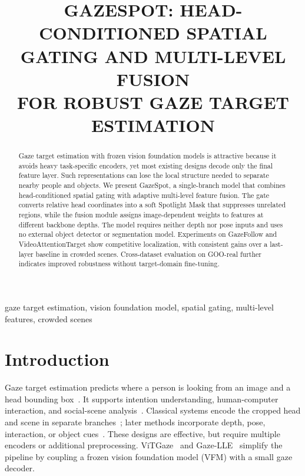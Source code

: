 \documentclass{article}
\title{GAZESPOT: HEAD-CONDITIONED SPATIAL GATING AND MULTI-LEVEL FUSION\\
FOR ROBUST GAZE TARGET ESTIMATION}
\begin{document}
\ninept
\maketitle

\begin{abstract}
Gaze target estimation with frozen vision foundation models is attractive because it avoids heavy task-specific encoders, yet most existing designs decode only the final feature layer. Such representations can lose the local structure needed to separate nearby people and objects. We present GazeSpot, a single-branch model that combines head-conditioned spatial gating with adaptive multi-level feature fusion. The gate converts relative head coordinates into a soft Spotlight Mask that suppresses unrelated regions, while the fusion module assigns image-dependent weights to features at different backbone depths. The model requires neither depth nor pose inputs and uses no external object detector or segmentation model. Experiments on GazeFollow and VideoAttentionTarget show competitive localization, with consistent gains over a last-layer baseline in crowded scenes. Cross-dataset evaluation on GOO-real further indicates improved robustness without target-domain fine-tuning.
\end{abstract}

\begin{keywords}
gaze target estimation, vision foundation model, spatial gating, multi-level features, crowded scenes
\end{keywords}

\section{Introduction}
Gaze target estimation predicts where a person is looking from an image and a head bounding box~\cite{recasens2015they,chong2020detecting,recasens2017following}. It supports intention understanding, human-computer interaction, and social-scene analysis~\cite{fathi2012learning,zander2010combining,emery2000eyes}. Classical systems encode the cropped head and scene in separate branches~\cite{chong2020detecting,fang2021dual}; later methods incorporate depth, pose, interaction, or object cues~\cite{bao2022escnet,gupta2022modular,tonini2022multimodal,tonini2023object,wang2022gatector}. These designs are effective, but require multiple encoders or additional preprocessing. ViTGaze~\cite{song2024vitgaze} and Gaze-LLE~\cite{ryan2025gaze} simplify the pipeline by coupling a frozen vision foundation model (VFM) with a small gaze decoder.
\end{document}
